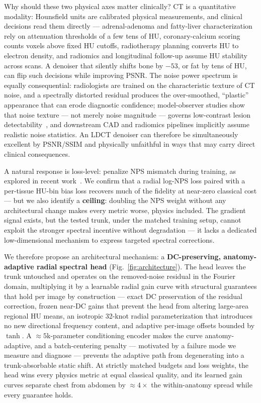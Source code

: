 Why should these two physical axes matter clinically? CT is a quantitative modality: Hounsfield units are calibrated physical measurements, and clinical decisions read them directly --- adrenal-adenoma and fatty-liver characterization rely on attenuation thresholds of a few tens of HU, coronary-calcium scoring counts voxels above fixed HU cutoffs, radiotherapy planning converts HU to electron density, and radiomics and longitudinal follow-up assume HU stability across scans. A denoiser that silently shifts bone by $-53$\hu{}, or fat by tens of HU, can flip such decisions while improving PSNR. The noise power spectrum is equally consequential: radiologists are trained on the characteristic texture of CT noise, and a spectrally distorted residual produces the over-smoothed, ``plastic'' appearance that can erode diagnostic confidence; model-observer studies show that noise texture --- not merely noise magnitude --- governs low-contrast lesion detectability~\cite{solomon2012,solomon2020}, and downstream CAD and radiomics pipelines implicitly assume realistic noise statistics. An LDCT denoiser can therefore be simultaneously excellent by PSNR/SSIM and physically unfaithful in ways that may carry direct clinical consequences.

A natural response is loss-level: penalize NPS mismatch during training, as explored in recent work~\cite{li2025,zhang2025}. We confirm that a radial log-NPS loss paired with a per-tissue HU-bin bias loss recovers much of the fidelity at near-zero classical cost --- but we also identify a \textbf{ceiling}: doubling the NPS weight without any architectural change makes every metric worse, physics included. The gradient signal exists, but the tested trunk, under the matched training setup, cannot exploit the stronger spectral incentive without degradation --- it lacks a dedicated low-dimensional mechanism to express targeted spectral corrections.

We therefore propose an architectural mechanism: a \textbf{DC-preserving, anatomy-adaptive radial spectral head} (Fig.~\ref{fig:architecture}). The head leaves the trunk untouched and operates on the removed-noise residual in the Fourier domain, multiplying it by a learnable radial gain curve with structural guarantees that hold per image by construction --- exact DC preservation of the residual correction, frozen near-DC gains that prevent the head from altering large-area regional HU means, an isotropic 32-knot radial parameterization that introduces no new directional frequency content, and adaptive per-image offsets bounded by $\tanh$. A ${\approx}5$k-parameter conditioning encoder makes the curve anatomy-adaptive, and a batch-centering penalty --- motivated by a failure mode we measure and diagnose --- prevents the adaptive path from degenerating into a trunk-absorbable static shift. At strictly matched budgets and loss weights, the head wins every physics metric at equal classical quality, and its learned gain curves separate chest from abdomen by ${\approx}4\times$ the within-anatomy spread while every guarantee holds.

